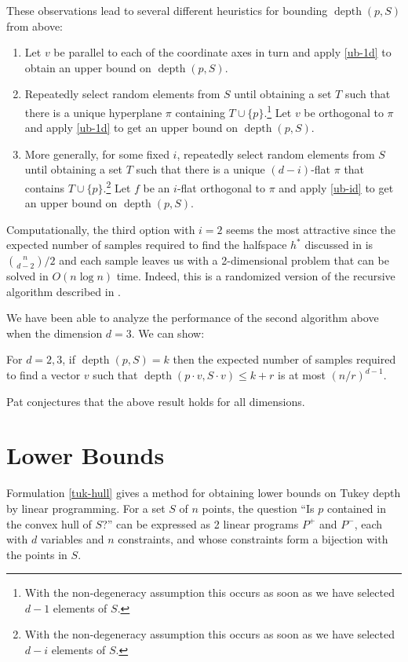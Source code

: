\documentclass[lotsofwhite,12pt]{patmorin}
\DeclareMathOperator{\td}{depth}
\begin{document}
These observations lead to several different heuristics for bounding
$\td(p,S)$ from above:

\begin{enumerate}
\item Let $v$ be parallel to each of the coordinate axes in turn and
apply \eqref{ub-1d} to obtain an upper bound on $\td(p,S)$.

\item Repeatedly select random elements from $S$ until obtaining a set
$T$ such that there is a unique hyperplane $\pi$ containing
$T\cup\{p\}$.\footnote{With the non-degeneracy assumption this occurs
as soon as we have selected $d-1$ elements of $S$.} Let $v$ be
orthogonal to $\pi$ and apply \eqref{ub-1d} to get an upper bound on
$\td(p,S)$.

\item More generally, for some fixed $i$, repeatedly select random
elements from $S$ until obtaining a set $T$ such that there is a
unique $(d-i)$-flat $\pi$  that contains $T\cup\{p\}$.\footnote{With
the non-degeneracy assumption this occurs as soon as we have selected
$d-i$ elements of $S$.}  Let $f$ be an
$i$-flat orthogonal to $\pi$ and apply \eqref{ub-id} to get an upper
bound on $\td(p,S)$.

\end{enumerate}


Computationally, the third option with $i=2$ seems the most attractive
since the expected number of samples required to find the halfspace
$h^*$ discussed in  is ${n\choose d-2}/2$ and each
sample leaves us with a 2-dimensional problem that can be solved in
$O(n\log n)$ time.  Indeed, this is a randomized version of the
recursive algorithm described in .

 We have been able to analyze the
performance of the second algorithm above when the dimension $d=3$. We
can show:
\begin{thm}
For $d=2,3$, if $\td(p,S)=k$ then the expected number of samples required to
find a vector $v$ such that $\td(p\cdot v,S\cdot v) \le k+r$ is at
most $(n/r)^{d-1}$.
\end{thm}
Pat conjectures that the above result holds for all dimensions.

\section{Lower Bounds}

Formulation \eqref{tuk-hull} gives a method for obtaining lower bounds
on Tukey depth by linear programming.  For a set $S$ of $n$ points,
the question ``Is $p$ contained in the convex hull of $S$?'' can be
expressed as 2 linear programs $P^+$ and $P^-$, each with $d$
variables and $n$ constraints, and whose constraints form a bijection
with the points in $S$.  
\end{document}
